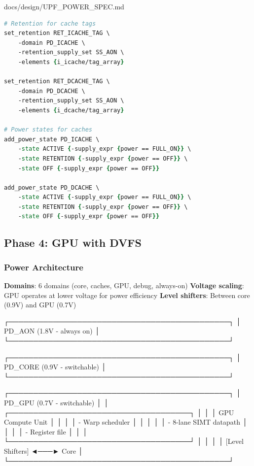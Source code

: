 \begin{relocated}{docs/design/UPF_POWER_SPEC.md}
\begin{lstlisting}[language=tcl]
# Retention for cache tags
set_retention RET_ICACHE_TAG \
    -domain PD_ICACHE \
    -retention_supply_set SS_AON \
    -elements {i_icache/tag_array}

set_retention RET_DCACHE_TAG \
    -domain PD_DCACHE \
    -retention_supply_set SS_AON \
    -elements {i_dcache/tag_array}

# Power states for caches
add_power_state PD_ICACHE \
    -state ACTIVE {-supply_expr {power == FULL_ON}} \
    -state RETENTION {-supply_expr {power == OFF}} \
    -state OFF {-supply_expr {power == OFF}}

add_power_state PD_DCACHE \
    -state ACTIVE {-supply_expr {power == FULL_ON}} \
    -state RETENTION {-supply_expr {power == OFF}} \
    -state OFF {-supply_expr {power == OFF}}
\end{lstlisting}

\subsection{Phase 4: GPU with DVFS}\label{ds:ch:upf-power-spec:phase-4-gpu-with-dvfs}

\subsubsection{Power Architecture}\label{ds:ch:upf-power-spec:power-architecture-3}

\textbf{Domains}: 6 domains (core, caches, GPU, debug, always-on)
\textbf{Voltage scaling}: GPU operates at lower voltage for power
efficiency \textbf{Level shifters}: Between core (0.9V) and GPU (0.7V)

\begin{textblock}
┌─────────────────────────────────────────────┐
│         PD_AON (1.8V - always on)           │
└─────────────────────────────────────────────┘

┌─────────────────────────────────────────────┐
│         PD_CORE (0.9V - switchable)         │
└─────────────────────────────────────────────┘

┌─────────────────────────────────────────────┐
│          PD_GPU (0.7V - switchable)         │
│  ┌─────────────────────────────────────┐   │
│  │  GPU Compute Unit                   │   │
│  │  - Warp scheduler                   │   │
│  │  │  - 8-lane SIMT datapath         │   │
│  │  - Register file                    │   │
│  └─────────────────────────────────────┘   │
│                                             │
│       [Level Shifters] ◄───► Core          │
└─────────────────────────────────────────────┘
\end{textblock}


\end{relocated}
